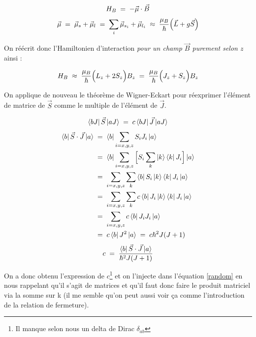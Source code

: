 \begin{equation*}
    H_B \; = \; -\vec{\mu} \cdot \vec{B}
\end{equation*}
\begin{equation*}
    \vec{\mu} \; = \; \vec{\mu}_{s} + \vec{\mu}_{l} \; = \; \sum_i \vec{\mu}_{s_i} + \vec{\mu}_{l_i} \; \approx \; \dfrac{\mu_B}{\hbar}\Big( \vec{L} + g\vec{S}\Big)
\end{equation*}

On réécrit donc l'Hamiltonien d'interaction \emph{pour un champ $\vec{B}$ purement selon $z$} ainsi :

\begin{equation*}
    H_B \;\approx\; \dfrac{\mu_B}{\hbar}\Big( L_z + 2 S_z\Big)B_z \; = \; \dfrac{\mu_B}{\hbar}\Big( J_z + S_z\Big)B_z
\end{equation*}

On applique de nouveau le théorème de Wigner-Eckart pour réexprimer l'élément de matrice de $\vec{S}$ comme le multiple de l'élément de $\vec{J}$.

\begin{equation}
    \bra{bJ}\vec{S}\ket{aJ} \; = \; c \bra{bJ}\vec{J}\ket{aJ}
    \label{random}
\end{equation}
\begin{align*}
    \bra{b}\vec{S}\cdot\vec{J}\ket{a} 
    &\; = \; 
    \bra{b} \sum_{i=x,y,z}S_i J_i\ket{a} \\
    &\; = \; 
    \bra{b} \sum_{i=x,y,z} \Big[ S_i \sum_k \ket{k}\bra{k} J_i \Big] \ket{a} \\
    &\; = \; 
    \sum_{i=x,y,z} \sum_k \bra{b}S_i\ket{k} \bra{k}J_i\ket{a} \\
    &\; = \; 
    \sum_{i=x,y,z} \sum_k c\bra{b}J_i\ket{k} \bra{k}J_i\ket{a} \\
    &\; = \; 
    \sum_{i=x,y,z} c\bra{b}J_iJ_i\ket{a} \\
    &\; = \; 
    c\bra{b}J^2\ket{a} \; = \; c \hbar^2 J(J+1)
\end{align*}
\begin{equation*}
    c \; = \; \dfrac{\bra{b}\vec{S}\cdot\vec{J}\ket{a}}{\hbar^2 J(J+1)}
\end{equation*}

On a donc obtenu l'expression de $c$\footnote{Il manque selon nous un delta de Dirac $\delta_{ab}$} et on l'injecte dans l'équation \ref{random} en nous rappelant qu'il s'agit de matrices et qu'il faut donc faire le produit matriciel via la somme sur k (il me semble qu'on peut aussi voir ça comme l'introduction de la relation de fermeture).

